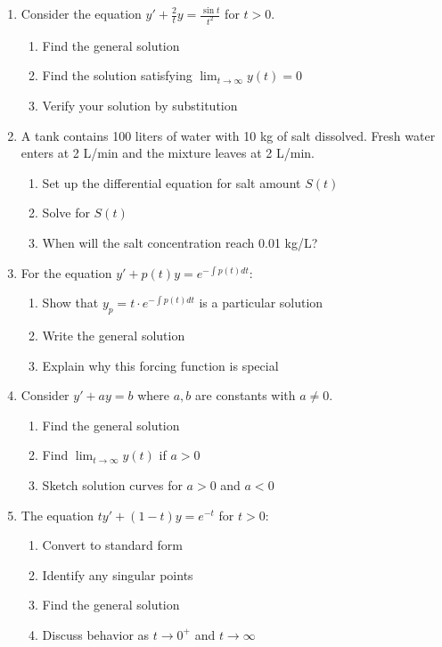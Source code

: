 \documentclass[12pt]{article}
\begin{document}
\begin{enumerate}[resume]
\item Consider the equation $y' + \frac{2}{t}y = \frac{\sin t}{t^2}$ for $t > 0$.
\begin{enumerate}
\item Find the general solution
\item Find the solution satisfying $\lim_{t \to \infty} y(t) = 0$
\item Verify your solution by substitution
\end{enumerate}

\item A tank contains 100 liters of water with 10 kg of salt dissolved. Fresh water enters at 2 L/min and the mixture leaves at 2 L/min.
\begin{enumerate}
\item Set up the differential equation for salt amount $S(t)$
\item Solve for $S(t)$
\item When will the salt concentration reach 0.01 kg/L?
\end{enumerate}

\item For the equation $y' + p(t)y = e^{-\int p(t)dt}$:
\begin{enumerate}
\item Show that $y_p = t \cdot e^{-\int p(t)dt}$ is a particular solution
\item Write the general solution
\item Explain why this forcing function is special
\end{enumerate}

\item Consider $y' + ay = b$ where $a, b$ are constants with $a \neq 0$.
\begin{enumerate}
\item Find the general solution
\item Find $\lim_{t \to \infty} y(t)$ if $a > 0$
\item Sketch solution curves for $a > 0$ and $a < 0$
\end{enumerate}

\item The equation $ty' + (1-t)y = e^{-t}$ for $t > 0$:
\begin{enumerate}
\item Convert to standard form
\item Identify any singular points
\item Find the general solution
\item Discuss behavior as $t \to 0^+$ and $t \to \infty$
\end{enumerate}
\end{enumerate}
\end{document}
